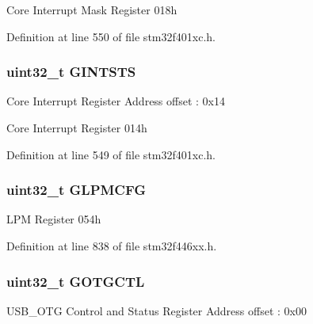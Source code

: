 Core Interrupt Mask Register 018h 

Definition at line 550 of file stm32f401xc.\+h.

\subsubsection[{\texorpdfstring{G\+I\+N\+T\+S\+TS}{GINTSTS}}]{ uint32\+\_\+t G\+I\+N\+T\+S\+TS}\hypertarget{struct_u_s_b___o_t_g___global_type_def_a9980c4a55080745a11528f8c7ffa1c66}{}\label{struct_u_s_b___o_t_g___global_type_def_a9980c4a55080745a11528f8c7ffa1c66}
Core Interrupt Register Address offset \+: 0x14

Core Interrupt Register 014h 

Definition at line 549 of file stm32f401xc.\+h.

\subsubsection[{\texorpdfstring{G\+L\+P\+M\+C\+FG}{GLPMCFG}}]{ uint32\+\_\+t G\+L\+P\+M\+C\+FG}\hypertarget{struct_u_s_b___o_t_g___global_type_def_a5b7c9cb9dbd528e59d39bd7e72ca6fe9}{}\label{struct_u_s_b___o_t_g___global_type_def_a5b7c9cb9dbd528e59d39bd7e72ca6fe9}
L\+PM Register 054h 

Definition at line 838 of file stm32f446xx.\+h.

\subsubsection[{\texorpdfstring{G\+O\+T\+G\+C\+TL}{GOTGCTL}}]{ uint32\+\_\+t G\+O\+T\+G\+C\+TL}\hypertarget{struct_u_s_b___o_t_g___global_type_def_a4f006a75f87074f02a532fbeb215bd24}{}\label{struct_u_s_b___o_t_g___global_type_def_a4f006a75f87074f02a532fbeb215bd24}
U\+S\+B\+\_\+\+O\+TG Control and Status Register Address offset \+: 0x00

